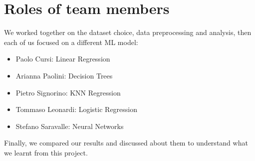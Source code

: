 \documentclass{article}
\begin{document}
\section{Roles of team members}
We worked together on the dataset choice, data preprocessing and analysis, then each of us focused on a different ML model: 
\begin{itemize}
    \item Paolo Cursi: Linear Regression
    \item Arianna Paolini: Decision Trees
    \item Pietro Signorino: KNN Regression
    \item Tommaso Leonardi: Logistic Regression
    \item Stefano Saravalle: Neural Networks
\end{itemize}
Finally, we compared our results and discussed about them to understand what we learnt from this project.



\end{document}
